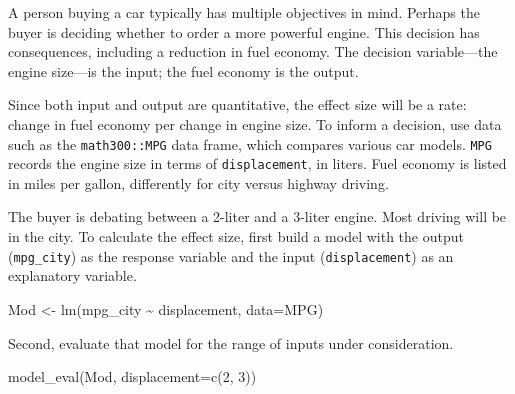 \documentclass[
  letterpaper,
  DIV=11,
  numbers=noendperiod,
  oneside]{scrreprt}
\newenvironment{Shaded}{\begin{snugshade}}{\end{snugshade}}
\newcommand{\AttributeTok}[1]{\textcolor[rgb]{0.40,0.45,0.13}{#1}}
\newcommand{\DecValTok}[1]{\textcolor[rgb]{0.68,0.00,0.00}{#1}}
\newcommand{\FunctionTok}[1]{\textcolor[rgb]{0.28,0.35,0.67}{#1}}
\newcommand{\NormalTok}[1]{\textcolor[rgb]{0.00,0.23,0.31}{#1}}
\newcommand{\OtherTok}[1]{\textcolor[rgb]{0.00,0.23,0.31}{#1}}
\newcommand{\SpecialCharTok}[1]{\textcolor[rgb]{0.37,0.37,0.37}{#1}}
\begin{document}
\begin{tcolorbox}[enhanced jigsaw, colbacktitle=quarto-callout-note-color!10!white, breakable, opacitybacktitle=0.6, colback=white, left=2mm, arc=.35mm, colframe=quarto-callout-note-color-frame, coltitle=black, toprule=.15mm, opacityback=0, leftrule=.75mm, bottomtitle=1mm, toptitle=1mm, titlerule=0mm, title=\textcolor{quarto-callout-note-color}{\faInfo}\hspace{0.5em}{Example: Fuel economy}, rightrule=.15mm, bottomrule=.15mm]

A person buying a car typically has multiple objectives in mind. Perhaps
the buyer is deciding whether to order a more powerful engine. This
decision has consequences, including a reduction in fuel economy. The
decision variable---the engine size---is the input; the fuel economy is
the output.

Since both input and output are quantitative, the effect size will be a
rate: change in fuel economy per change in engine size. To inform a
decision, use data such as the \texttt{math300::MPG} data frame, which
compares various car models. \texttt{MPG} records the engine size in
terms of \texttt{displacement}, in liters. Fuel economy is listed in
miles per gallon, differently for city versus highway driving.

The buyer is debating between a 2-liter and a 3-liter engine. Most
driving will be in the city. To calculate the effect size, first build a
model with the output (\texttt{mpg\_city}) as the response variable and
the input (\texttt{displacement}) as an explanatory variable.

\begin{Shaded}
\begin{Highlighting}[]
\NormalTok{Mod }\OtherTok{\textless{}{-}} \FunctionTok{lm}\NormalTok{(mpg\_city }\SpecialCharTok{\textasciitilde{}}\NormalTok{ displacement, }\AttributeTok{data=}\NormalTok{MPG)}
\end{Highlighting}
\end{Shaded}

Second, evaluate that model for the range of inputs under consideration.

\begin{Shaded}
\begin{Highlighting}[]
\FunctionTok{model\_eval}\NormalTok{(Mod, }\AttributeTok{displacement=}\FunctionTok{c}\NormalTok{(}\DecValTok{2}\NormalTok{, }\DecValTok{3}\NormalTok{))}
\end{Highlighting}
\end{Shaded}


\end{tcolorbox}
\end{document}
